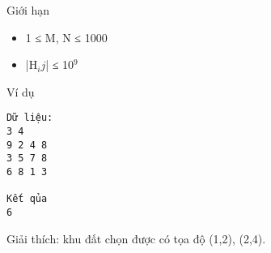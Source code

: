 Giới hạn
\begin{itemize}
	\item 1 ≤ M, N ≤ 1000
	\item |H$_ij$| ≤ 10$^9$
\end{itemize}
Ví dụ
\begin{verbatim}
Dữ liệu:
3 4
9 2 4 8
3 5 7 8
6 8 1 3

Kết qủa
6
\end{verbatim}

Giải thích: khu đất chọn được có tọa độ (1,2), (2,4).